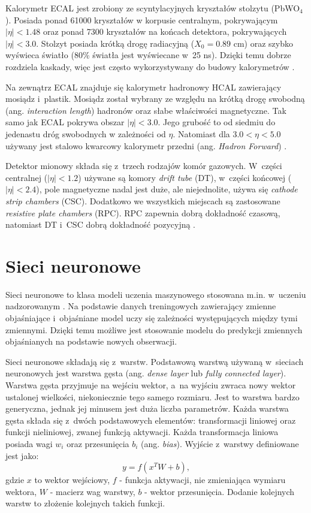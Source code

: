 \documentclass{pracalicmgr}
\begin{document}
	Kalorymetr ECAL jest zrobiony ze scyntylacyjnych kryształów stolzytu (PbWO$_4$). Posiada ponad 61000 kryształów w korpusie centralnym, pokrywającym $|\eta| < 1.48$ oraz ponad 7300 kryształów na końcach detektora, pokrywających $|\eta| < 3.0$. Stolzyt posiada krótką drogę radiacyjną ($X_0 = 0.89$ cm) oraz szybko wyświeca światło (80\% światła jest wyświecane w~25 ns). Dzięki temu dobrze rozdziela kaskady, więc jest często wykorzystywany do budowy kalorymetrów \cite{cms_technical}.
	
	Na zewnątrz ECAL znajduje się kalorymetr hadronowy HCAL zawierający mosiądz i~plastik. Mosiądz został wybrany ze względu na krótką drogę swobodną (ang. \textit{interaction length}) hadronów oraz słabe właściwości magnetyczne.
Tak samo jak ECAL pokrywa obszar $|\eta| < 3.0$. Jego grubość to od siedmiu do jedenastu dróg swobodnych w zależności od $\eta$. Natomiast dla $3.0 < \eta < 5.0$ używany jest stalowo kwarcowy kalorymetr przedni (ang. \textit{Hadron Forward}) \cite{cms_technical}.
	
	Detektor mionowy składa się z~trzech rodzajów komór gazowych. W~części centralnej ($|\eta| < 1.2$) używane są komory \textit{drift tube} (DT), w~części końcowej ($|\eta| < 2.4$), pole magnetyczne nadal jest duże, ale niejednolite, używa się \textit{cathode strip chambers} (CSC). Dodatkowo we wszystkich miejscach są zastosowane \textit{resistive plate chambers} (RPC). RPC zapewnia dobrą dokładność czasową, natomiast DT i~CSC dobrą dokładność pozycyjną \cite{cms_technical}.	
	
	\section{Sieci neuronowe}
	Sieci neuronowe to klasa modeli uczenia maszynowego stosowana m.in. w~uczeniu nadzorowanym \cite{dl}. Na podstawie danych treningowych zawierający zmienne objaśniające i~objaśniane model uczy się zależności występujących między tymi zmiennymi. Dzięki temu możliwe jest stosowanie modelu do predykcji zmiennych objaśnianych na podstawie nowych obserwacji.
	
	Sieci neuronowe składają się z~warstw. Podstawową warstwą używaną w~sieciach neuronowych jest warstwa gęsta (ang. \textit{dense layer} lub \textit{fully connected layer}). Warstwa gęsta przyjmuje na wejściu wektor, a~na wyjściu zwraca nowy wektor ustalonej wielkości, niekoniecznie tego samego rozmiaru. Jest to warstwa bardzo generyczna, jednak jej minusem jest duża liczba parametrów. Każda warstwa gęsta składa się z~dwóch podstawowych elementów: transformacji liniowej oraz funkcji nieliniowej, zwanej funkcją aktywacji. Każda transformacja liniowa posiada wagi $w_i$ oraz przesunięcia $b_i$ (ang. \textit{bias}). Wyjście z~warstwy definiowane jest jako: $$y = f(x^TW + b),$$ gdzie $x$ to wektor wejściowy, $f$ - funkcja aktywacji, nie zmieniająca wymiaru wektora, $W$ - macierz wag warstwy, $b$ - wektor przesunięcia. Dodanie kolejnych warstw to złożenie kolejnych takich funkcji.
	
\end{document}
